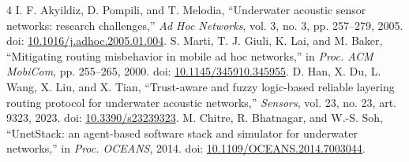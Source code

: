 \documentclass[11pt]{article}
\begin{document}
\begin{thebibliography}{4}\small
{} I. F. Akyildiz, D. Pompili, and T. Melodia, ``Underwater acoustic sensor networks: research challenges,'' \emph{Ad Hoc Networks}, vol. 3, no. 3, pp. 257--279, 2005. doi: \href{https://doi.org/10.1016/j.adhoc.2005.01.004}{10.1016/j.adhoc.2005.01.004}.
 S. Marti, T. J. Giuli, K. Lai, and M. Baker, ``Mitigating routing misbehavior in mobile ad hoc networks,'' in \emph{Proc. ACM MobiCom}, pp. 255--265, 2000. doi: \href{https://doi.org/10.1145/345910.345955}{10.1145/345910.345955}.
 D. Han, X. Du, L. Wang, X. Liu, and X. Tian, ``Trust-aware and fuzzy logic-based reliable layering routing protocol for underwater acoustic networks,'' \emph{Sensors}, vol. 23, no. 23, art. 9323, 2023. doi: \href{https://doi.org/10.3390/s23239323}{10.3390/s23239323}.
 M. Chitre, R. Bhatnagar, and W.-S. Soh, ``UnetStack: an agent-based software stack and simulator for underwater networks,'' in \emph{Proc. OCEANS}, 2014. doi: \href{https://doi.org/10.1109/OCEANS.2014.7003044}{10.1109/OCEANS.2014.7003044}.
\end{thebibliography}
\end{document}
